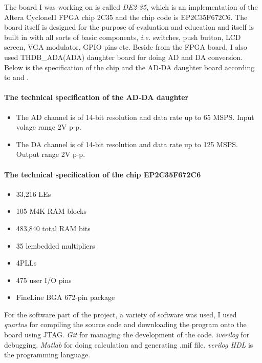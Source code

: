 \documentclass[11pt]{scrartcl}
\begin{document}
The board I was working on is called \textit{DE2-35}, which is an implementation of the Altera Cyclone\textregistered II FPGA chip 2C35 and the chip code is EP2C35F672C6. The board itself is designed for the purpose of evaluation and education and itself is built in with all sorts of basic components, \textit{i.e.} switches, push button, LCD screen, VGA modulator, GPIO pins etc. Beside from the FPGA board, I also used THDB\_ADA(ADA) daughter board for doing AD and DA conversion. Below is the specification of the chip and the AD-DA daughter board according to \cite{DE2UserManual} and \cite{addaman}.

\paragraph{The technical specification of the AD-DA daughter}

\begin{itemize}
    \item The AD channel is of 14-bit resolution and data rate up to 65 MSPS. Input volage range 2V p-p.
    \item The DA channel is of 14-bit resolution and data rate up to 125 MSPS. Output range 2V p-p.
\end{itemize}

\paragraph{The technical specification of the chip EP2C35F672C6 }
\begin{itemize}
    \item 33,216 LEs
    \item 105 M4K RAM blocks
    \item 483,840 total RAM bits
    \item 35 lembedded multipliers
    \item 4PLLs
    \item 475 user I/O pins
    \item FineLine BGA 672-pin package
\end{itemize}

For the software part of the project, a variety of software was used, I used \textit{quartus} for compiling the source code and downloading the program onto the board using JTAG. \textit{Git} for managing the development of the code. \textit{iverilog} for debugging. \textit{Matlab} for doing calculation and generating .mif file. \textit{verilog HDL} is the programming language.\\
\end{document}
